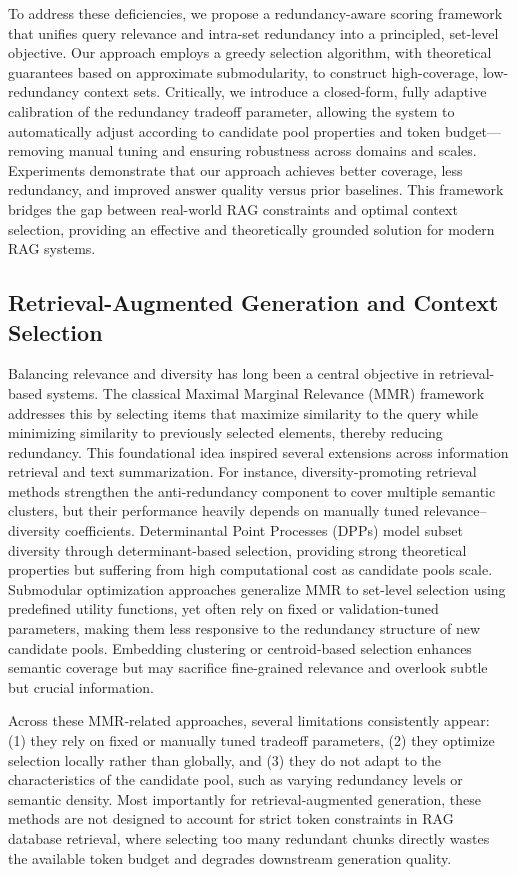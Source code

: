 \documentclass[11pt]{article}
\begin{document}
To address these deficiencies, we propose a redundancy-aware scoring framework that unifies query relevance and intra-set redundancy into a principled, set-level objective. Our approach employs a greedy selection algorithm, with theoretical guarantees based on approximate submodularity, to construct high-coverage, low-redundancy context sets. Critically, we introduce a closed-form, fully adaptive calibration of the redundancy tradeoff parameter, allowing the system to automatically adjust according to candidate pool properties and token budget—removing manual tuning and ensuring robustness across domains and scales. Experiments demonstrate that our approach achieves better coverage, less redundancy, and improved answer quality versus prior baselines. This framework bridges the gap between real-world RAG constraints and optimal context selection, providing an effective and theoretically grounded solution for modern RAG systems.

\subsection{Retrieval-Augmented Generation and Context Selection}
Balancing relevance and diversity has long been a central objective in retrieval-based systems. The classical Maximal Marginal Relevance (MMR) framework addresses this by selecting items that maximize similarity to the query while minimizing similarity to previously selected elements, thereby reducing redundancy\cite{18}. This foundational idea inspired several extensions across information retrieval and text summarization. For instance, diversity-promoting retrieval methods strengthen the anti-redundancy component to cover multiple semantic clusters, but their performance heavily depends on manually tuned relevance–diversity coefficients\cite{19}. Determinantal Point Processes (DPPs) model subset diversity through determinant-based selection, providing strong theoretical properties but suffering from high computational cost as candidate pools scale\cite{20}. Submodular optimization approaches generalize MMR to set-level selection using predefined utility functions, yet often rely on fixed or validation-tuned parameters, making them less responsive to the redundancy structure of new candidate pools\cite{21}. Embedding clustering or centroid-based selection enhances semantic coverage but may sacrifice fine-grained relevance and overlook subtle but crucial information\cite{22}.

Across these MMR‑related approaches, several limitations consistently appear:  
(1) they rely on fixed or manually tuned tradeoff parameters,  
(2) they optimize selection locally rather than globally, and  
(3) they do not adapt to the characteristics of the candidate pool, such as varying redundancy levels or semantic density.  
Most importantly for retrieval‑augmented generation, these methods are not designed to account for strict token constraints in RAG database retrieval, where selecting too many redundant chunks directly wastes the available token budget and degrades downstream generation quality.
\end{document}
